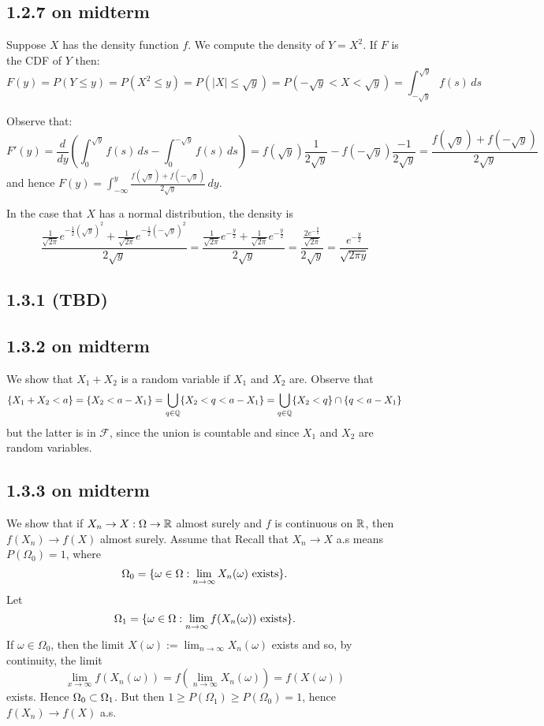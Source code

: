 \documentclass[11pt]{article}
\begin{document}
\subsection*{1.2.7 on midterm}

Suppose $X$ has the density function $f$. We compute the density of $Y=X^2$. If $F$ is the CDF of $Y$ then: \[F(y) = P(Y\leq y) = P(X^2 \leq y) = P(|X| \leq \sqrt{y}) = P(-\sqrt{y} < X < \sqrt{y}) = \int_{-\sqrt{y}}^{\sqrt{y}} f(s) \,ds\] 

Observe that: \[F'(y) = \frac{d}{dy}\left(\int_{0}^{\sqrt{y}} f(s) \,ds - \int_{0}^{-\sqrt{y}} f(s) \,ds\right) = f(\sqrt{y})\frac{1}{2\sqrt{y}} - f(-\sqrt{y})\frac{-1}{2\sqrt{y}}= \frac{f(\sqrt{y})+f(-\sqrt{y})}{2\sqrt{y}}\] and hence $F(y) = \int_{-\infty}^y \frac{f(\sqrt{y})+f(-\sqrt{y})}{2\sqrt{y}}\,dy$. 

In the case that $X$ has a normal distribution, the density is \[\frac{\frac{1}{\sqrt{2\pi}} e^{-\frac12 (\sqrt{y})^2} + \frac{1}{\sqrt{2\pi}} e^{-\frac12 (-\sqrt{y})^2}}{2\sqrt{y}} = \frac{\frac{1}{\sqrt{2\pi}} e^{-\frac{y}{2}} + \frac{1}{\sqrt{2\pi}} e^{-\frac{y}{2}}}{2\sqrt{y}}=\frac{\frac{2e^{-\frac{y}{2}}}{\sqrt{2\pi}}}{2\sqrt{y}}=\frac{e^{-\frac{y}{2}}}{\sqrt{2\pi y}}\]

\subsection*{1.3.1 (TBD)}

\subsection*{1.3.2 on midterm}

We show that $X_1 + X_2$ is a random variable if $X_1$ and $X_2$ are. Observe that \[\{X_1 + X_2 < a\} = \{X_2 < a - X_1\} = \bigcup_{q \in {\mathbb Q}} \{X_2 < q < a - X_1\} = \bigcup_{q \in {\mathbb Q}}  \{X_2 < q\} \cap \{q < a - X_1\} \] but the latter is in $\mathcal{F}$, since the union is countable and since $X_1$ and $X_2$ are random variables.

\subsection*{1.3.3 on midterm}

We show that if $X_n \to X : \Omega \to {\mathbb R}$ almost surely and $f$ is continuous on ${\mathbb R}$, then $f(X_n) \to f(X)$ almost surely. Assume that Recall that $X_n \to X$ a.s means $P(\Omega_0) = 1$, where \[\Omega_0 = \{\omega \in \Omega: \lim_{n\to \infty} X_n(\omega) \text{ exists}\}.\] Let \[\Omega_1 =  \{\omega \in \Omega: \lim_{n\to \infty} f(X_n(\omega)) \text{ exists}\}.\] If $\omega \in \Omega_0$, then the limit $X(\omega) := \lim_{n\to \infty} X_n(\omega)$ exists and so, by continuity, the limit \[\lim_{x\to \infty } f(X_n(\omega)) = f(\lim_{n\to \infty} X_n(\omega)) = f(X(\omega))\] exists. Hence $\Omega_0 \subset \Omega_1$. But then $1 \geq P(\Omega_1) \geq P(\Omega_0) = 1$, hence $f(X_n) \to f(X)$ a.s.
\end{document}
